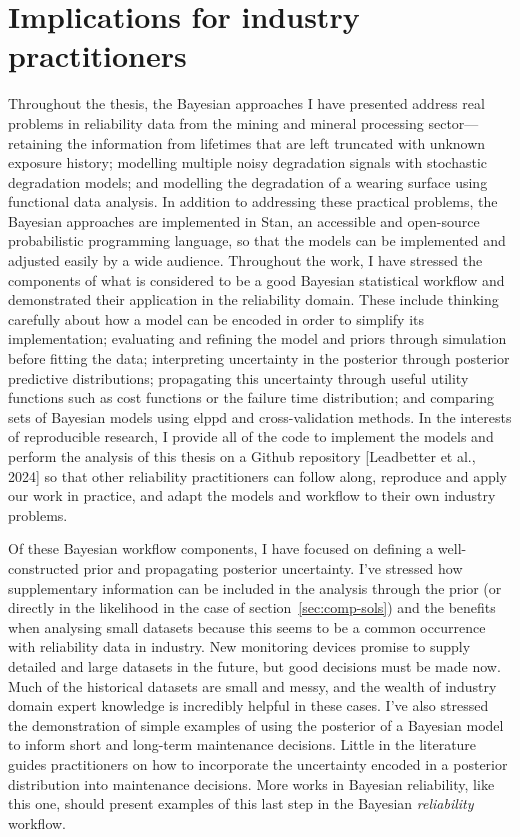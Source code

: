 \section{Implications for industry practitioners} \label{sec:thesis-practical}

Throughout the thesis, the Bayesian approaches I have presented address real problems in reliability data from the mining and mineral processing sector---retaining the information from lifetimes that are left truncated with unknown exposure history; modelling multiple noisy degradation signals with stochastic degradation models; and modelling the degradation of a wearing surface using functional data analysis. In addition to addressing these practical problems, the Bayesian approaches are implemented in Stan, an accessible and open-source probabilistic programming language, so that the models can be implemented and adjusted easily by a wide audience. Throughout the work, I have stressed the components of what is considered to be a good Bayesian statistical workflow and demonstrated their application in the reliability domain. These include thinking carefully about how a model can be encoded in order to simplify its implementation; evaluating and refining the model and priors through simulation before fitting the data; interpreting uncertainty in the posterior through posterior predictive distributions; propagating this uncertainty through useful utility functions such as cost functions or the failure time distribution; and comparing sets of Bayesian models using $\mbox{elppd}$ and cross-validation methods. In the interests of reproducible research, I provide all of the code to implement the models and perform the analysis of this thesis on a Github repository [Leadbetter et al., 2024] so that other reliability practitioners can follow along, reproduce and apply our work in practice, and adapt the models and workflow to their own industry problems.

Of these Bayesian workflow components, I have focused on defining a well-constructed prior and propagating posterior uncertainty. I've stressed how supplementary information can be included in the analysis through the prior (or directly in the likelihood in the case of section~\ref{sec:comp-sols}) and the benefits when analysing small datasets because this seems to be a common occurrence with reliability data in industry. New monitoring devices promise to supply detailed and large datasets in the future, but good decisions must be made now. Much of the historical datasets are small and messy, and the wealth of industry domain expert knowledge is incredibly helpful in these cases. I've also stressed the demonstration of simple examples of using the posterior of a Bayesian model to inform short and long-term maintenance decisions. Little in the literature guides practitioners on how to incorporate the uncertainty encoded in a posterior distribution into maintenance decisions. More works in Bayesian reliability, like this one, should present examples of this last step in the Bayesian \textit{reliability} workflow.


